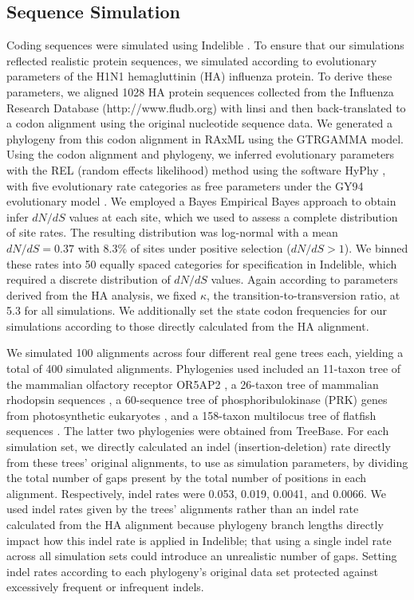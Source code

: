 \documentclass[10pt]{article}
\begin{document}
\subsection*{Sequence Simulation}
Coding sequences were simulated using Indelible \citep{Fletcher2009}. To ensure that our simulations reflected realistic protein sequences, we simulated according to evolutionary parameters of the H1N1 hemagluttinin (HA) influenza protein. To derive these parameters, we aligned 1028 HA protein sequences collected from the Influenza Research Database (http://www.fludb.org) with linsi \citep{Katoh2002,Katoh2005} and then back-translated to a codon alignment using the original nucleotide sequence data. We generated a phylogeny from this codon alignment in RAxML \citep{Stamatakis2006} using the GTRGAMMA model. Using the codon alignment and phylogeny, we inferred evolutionary parameters with the REL (random effects likelihood)  method \citep{NielsenYang1998} using the software HyPhy \citep{Pond2005}, with five evolutionary rate categories as free parameters under the GY94 evolutionary model \citep{GoldmanYang1994}. We employed a Bayes Empirical Bayes approach \citep{Yang2000} to obtain infer $dN/dS$ values at each site, which we used to assess a complete distribution of site rates. The resulting distribution was log-normal with a mean $dN/dS = 0.37$ with 8.3\% of sites  under positive selection ($dN/dS>1$). We binned these rates into 50 equally spaced categories for specification in Indelible, which required a discrete distribution of $dN/dS$ values. Again according to parameters derived from the HA analysis, we fixed $\kappa$, the transition-to-transversion ratio, at 5.3 for all simulations. We additionally set the state codon frequencies for our simulations according to those directly calculated from the HA alignment. 

We simulated 100 alignments across four different real gene trees each, yielding a total of 400 simulated alignments. Phylogenies used included an 11-taxon tree of the mammalian olfactory receptor OR5AP2 \citep{Spielman2013}, a 26-taxon tree of mammalian rhodopsin sequences \citep{Spielman2013}, a 60-sequence tree of phosphoribulokinase (PRK) genes from photosynthetic eukaryotes \citep{Yang2011}, and a 158-taxon multilocus tree of flatfish sequences \citep{Betancur2013}. The latter two phylogenies were obtained from TreeBase.
For each simulation set, we directly calculated an indel (insertion-deletion) rate directly from these trees' original alignments, to use as simulation parameters, by dividing the total number of gaps present by the total number of positions in each alignment. Respectively, indel rates were 0.053, 0.019, 0.0041, and 0.0066. We used indel rates given by the trees' alignments rather than an indel rate calculated from the HA alignment because phylogeny branch lengths directly impact how this indel rate is applied in Indelible; that using a single indel rate across all simulation sets could introduce an unrealistic number of gaps. Setting indel rates according to each phylogeny's original data set protected against excessively frequent or infrequent indels.
\end{document}
